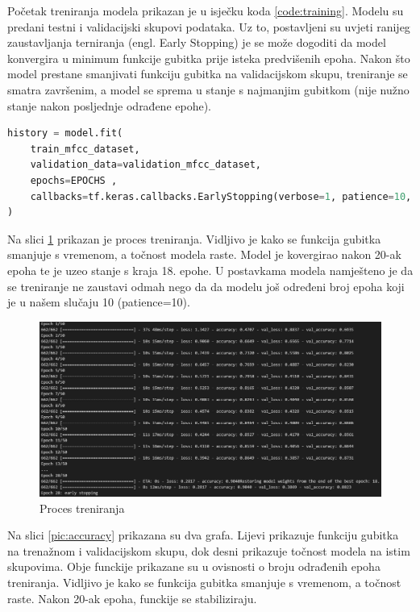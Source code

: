 Početak treniranja modela prikazan je u isječku koda \ref{code:training}. Modelu
su predani testni i validacijski skupovi podataka. Uz to, postavljeni su uvjeti ranijeg
zaustavljanja terniranja (engl. Early Stopping) je se može dogoditi da model
konvergira u minimum funkcije gubitka prije isteka predvišenih epoha. Nakon
što model prestane smanjivati funkciju gubitka na validacijskom skupu, treniranje
se smatra završenim, a model se sprema u stanje s najmanjim gubitkom (nije nužno 
stanje nakon posljednje odrađene epohe).

\begin{lstlisting}[language=Python, caption=Trening, label=code:training]
history = model.fit(
    train_mfcc_dataset,
    validation_data=validation_mfcc_dataset,
    epochs=EPOCHS ,
    callbacks=tf.keras.callbacks.EarlyStopping(verbose=1, patience=10, restore_best_weights=True),
)
\end{lstlisting}

Na slici \ref{pic:trening} prikazan je proces treniranja. Vidljivo je kako se funkcija
gubitka smanjuje s vremenom, a točnost modela raste. Model je kovergirao nakon 20-ak
epoha te je uzeo stanje s kraja 18. epohe. U postavkama modela namješteno je da se
treniranje ne zaustavi odmah nego da da modelu još određeni broj epoha koji je
u našem slučaju 10 (patience=10).

\begin{figure}[htb]
    \centering
    \includegraphics[width=0.7\linewidth]{Chapters/neuronska_mreza/trening/training.png} 
    \caption{Proces treniranja}
    \label{pic:trening}
\end{figure}

Na slici \ref{pic:accuracy} prikazana su dva grafa. Lijevi prikazuje funkciju gubitka
na trenažnom i validacijskom skupu, dok desni prikazuje točnost modela na istim skupovima.
Obje funckije prikazane su u ovisnosti o broju odrađenih epoha treniranja. Vidljivo je
kako se funkcija gubitka smanjuje s vremenom, a točnost raste. Nakon 20-ak epoha, funckije
se stabiliziraju. 

